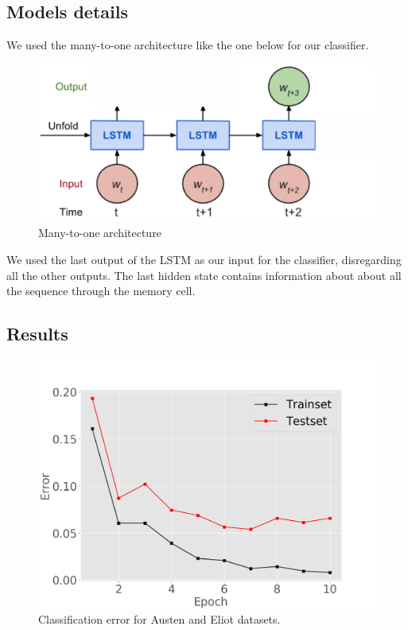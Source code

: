 
\subsection{Models details}

We used the many-to-one architecture like the one below for our 
classifier.
\begin{figure}[ht]
\vskip 0.2in
\begin{center}
\centerline{\includegraphics[width=\columnwidth]{manytoone}}
\caption{Many-to-one architecture}
\end{center}
\vskip -0.2in
\end{figure}
We used the last output of the LSTM as our input for the classifier, 
disregarding all the other outputs. The last hidden state contains 
information about about all the sequence through the memory cell. 

\subsection{Results}


\begin{figure}[ht]
\vskip 0.2in
\begin{center}
\centerline{\includegraphics[width=\columnwidth]{gejaclass}}
\caption{Classification error for Austen and Eliot datasets.}
\end{center}
\vskip -0.2in
\end{figure}

